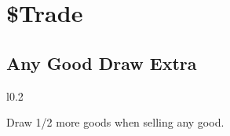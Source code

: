 \documentclass[letterpaper,landscape,twocolumn,8pt]{extarticle}
\begin{document}

\section*{\$\enspace{}Trade}%

\begin{minipage}[t]{0.31\columnwidth}
\subsection*{Any Good Draw Extra}

\setlength{\intextsep}{0pt}%

\begin{wrapfigure}{l}{0.2\columnwidth}
    
    
\end{wrapfigure}

Draw 1/2 more goods when selling any good.
\end{minipage}
\end{document}
